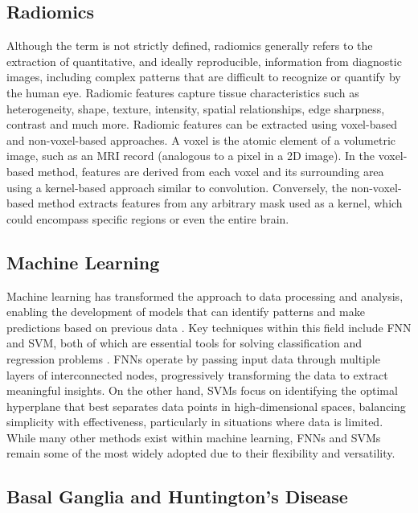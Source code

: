 \subsection{Radiomics}

Although the term is not strictly defined, radiomics generally refers to the extraction of quantitative, and ideally reproducible, information from diagnostic images, including complex patterns that are difficult to recognize or quantify by the human eye. \cite{radio} Radiomic features capture tissue characteristics such as heterogeneity, shape, texture, intensity, spatial relationships, edge sharpness, contrast and much more. \cite{radio2} Radiomic features can be extracted using voxel-based and non-voxel-based approaches. A voxel is the atomic element of a volumetric image, such as an MRI record (analogous to a pixel in a 2D image). In the voxel-based method, features are derived from each voxel and its surrounding area using a kernel-based approach similar to convolution. Conversely, the non-voxel-based method extracts features from any arbitrary mask used as a kernel, which could encompass specific regions or even the entire brain.

\subsection{Machine Learning}

Machine learning has transformed the approach to data processing and analysis, enabling the development of models that can identify patterns and make predictions based on previous data \cite{ml}. Key techniques within this field include \ac{FNN} and \ac{SVM}, both of which are essential tools for solving classification and regression problems \cite{fnn0} \cite{svm0}. \ac{FNN}s operate by passing input data through multiple layers of interconnected nodes, progressively transforming the data to extract meaningful insights. On the other hand, \ac{SVM}s focus on identifying the optimal hyperplane that best separates data points in high-dimensional spaces, balancing simplicity with effectiveness, particularly in situations where data is limited. While many other methods exist within machine learning, \ac{FNN}s and \ac{SVM}s remain some of the most widely adopted due to their flexibility and versatility.

\subsection{Basal Ganglia and Huntington’s Disease}

